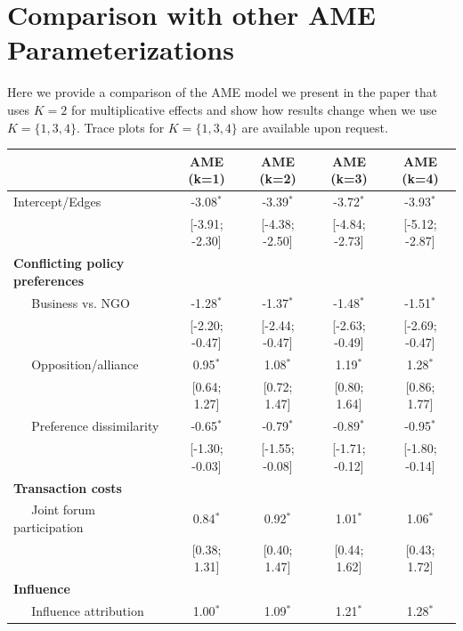 \documentclass[12pt,pdflatex]{elsarticle}
\begin{document}
\FloatBarrier

\clearpage
\section*{Comparison with other AME Parameterizations}
\label{sec:ameVsAmeAppendix}

Here we provide a comparison of the AME model we present in the paper that uses $K=2$ for multiplicative effects and show how results change when we use $K=\{1,3,4\}$. Trace plots for $K=\{1,3,4\}$ are available upon request.

\begin{table}[ht]
\centering
\begingroup\footnotesize
\begin{tabular}{lcccc}
   & AME (k=1) & AME (k=2) & AME (k=3) & AME (k=4) \\
  \hline
\hline
Intercept/Edges & -3.08$^{\ast}$ & -3.39$^{\ast}$ & -3.72$^{\ast}$ & -3.93$^{\ast}$ \\
   & [-3.91; -2.30] & [-4.38; -2.50] & [-4.84; -2.73] & [-5.12; -2.87] \\
  \textbf{Conflicting policy preferences} &  &  &  &  \\
  $\;\;\;\;$ Business vs. NGO & -1.28$^{\ast}$ & -1.37$^{\ast}$ & -1.48$^{\ast}$ & -1.51$^{\ast}$ \\
   & [-2.20; -0.47] & [-2.44; -0.47] & [-2.63; -0.49] & [-2.69; -0.47] \\
  $\;\;\;\;$ Opposition/alliance & 0.95$^{\ast}$ & 1.08$^{\ast}$ & 1.19$^{\ast}$ & 1.28$^{\ast}$ \\
   & [0.64; 1.27] & [0.72; 1.47] & [0.80; 1.64] & [0.86; 1.77] \\
  $\;\;\;\;$ Preference dissimilarity & -0.65$^{\ast}$ & -0.79$^{\ast}$ & -0.89$^{\ast}$ & -0.95$^{\ast}$ \\
   & [-1.30; -0.03] & [-1.55; -0.08] & [-1.71; -0.12] & [-1.80; -0.14] \\
  \textbf{Transaction costs} &  &  &  &  \\
  $\;\;\;\;$ Joint forum participation & 0.84$^{\ast}$ & 0.92$^{\ast}$ & 1.01$^{\ast}$ & 1.06$^{\ast}$ \\
   & [0.38; 1.31] & [0.40; 1.47] & [0.44; 1.62] & [0.43; 1.72] \\
  \textbf{Influence} &  &  &  &  \\
  $\;\;\;\;$ Influence attribution & 1.00$^{\ast}$ & 1.09$^{\ast}$ & 1.21$^{\ast}$ & 1.28$^{\ast}$ \\

\end{tabular}
\end{table}
\end{document}
